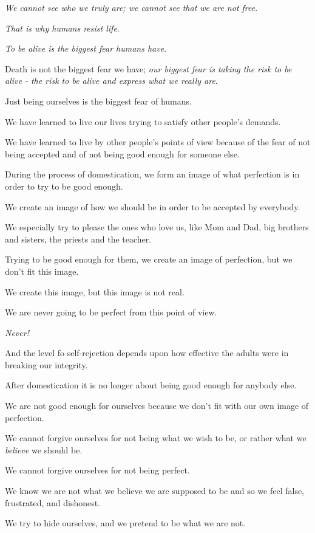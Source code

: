 \documentclass{article}
\numberwithin{equation}{section}
\begin{document}
\textit{We cannot see who we truly are; we cannot see that we are not free}.

%
\textit{That is why humans resist life}.

\textit{To be alive is the biggest fear humans have}.

Death is not the biggest fear we have; \textit{our biggest fear is taking the risk to be alive - the risk to be alive and express what we really are}.

Just being ourselves is the biggest fear of humans.

We have learned to live our lives trying to satisfy other people's demands.

We have learned to live by other people's points of view because of the fear of not being accepted and of not being good enough for someone else.

%
During the process of domestication, we form an image of what perfection is in order to try to be good enough.

We create an image of how we should be in order to be accepted by everybody.

We especially try to please the ones who love us, like Mom and Dad, big brothers and sisters, the priests and the teacher.

Trying to be good enough for them, we create an image of perfection, but we don't fit this image.

We create this image, but this image is not real.

We are never going to be perfect from this point of view.

\textit{Never!}

%

And the level fo self-rejection depends upon how effective the adults were in breaking our integrity.

After domestication it is no longer about being good enough for anybody else.

We are not good enough for ourselves because we don't fit with our own image of perfection.

We cannot forgive ourselves for not being what we wish to be, or rather what we \textit{believe} we should be.

We cannot forgive ourselves for not being perfect.

%
We know we are not what we believe we are supposed to be and so we feel false, frustrated, and dishonest.

We try to hide ourselves, and we pretend to be what we are not.
\end{document}
